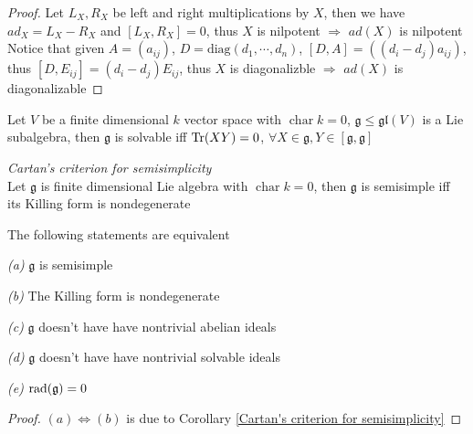 \documentclass[main]{subfiles}
\begin{document}
\begin{proof}
Let $L_X,R_X$ be left and right multiplications by $X$, then we have $ad_X=L_X-R_X$ and $[L_X,R_X]=0$, thus $X$ is nilpotent $\Rightarrow$ $ad(X)$ is nilpotent \\
Notice that given $A=(a_{ij})$, $D=\mathrm{diag}(d_1,\cdots,d_n)$, $[D,A]=((d_i-d_j)a_{ij})$, thus $[D,E_{ij}]=(d_i-d_j)E_{ij}$, thus $X$ is diagonalizble $\Rightarrow$ $ad(X)$ is diagonalizable
\end{proof}

\begin{theorem}\label{Cartan's criterion for solvability}
Let $V$ be a finite dimensional $k$ vector space with $\operatorname{char}k=0$, $\mathfrak{g}\leq\mathfrak{gl}(V)$ is a Lie subalgebra, then $\mathfrak{g}$ is solvable iff $\operatorname{Tr}(XY)=0$, $\forall X\in\mathfrak{g},Y\in[\mathfrak{g},\mathfrak{g}]$
\end{theorem}

\begin{corollary}\textit{Cartan's criterion for semisimplicity}\label{Cartan's criterion for semisimplicity} \\
Let $\mathfrak{g}$ is finite dimensional Lie algebra with $\operatorname{char}k=0$, then $\mathfrak{g}$ is semisimple iff its Killing form is nondegenerate
\end{corollary}

\begin{proposition}\label{Equivalent conditions for semisimplicity}
The following statements are equivalent \par
\textit{(a) }$\mathfrak{g}$ is semisimple \par
\textit{(b) }The Killing form is nondegenerate\par
\textit{(c) }$\mathfrak{g}$ doesn't have have nontrivial abelian ideals\par
\textit{(d) }$\mathfrak{g}$ doesn't have have nontrivial solvable ideals\par
\textit{(e) }$\operatorname{rad}(\mathfrak{g})=0$\par
\end{proposition}

\begin{proof}
$(a)\Leftrightarrow(b)$ is due to Corollary \ref{Cartan's criterion for semisimplicity}
\end{proof}
\end{document}
